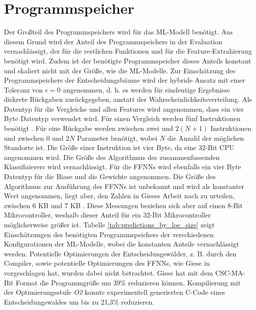\section{Programmspeicher}
Der Großteil des Programmspeichers wird für das ML-Modell benötigt.
Aus diesem Grund wird der Anteil des Programmspeichers in der Evaluation vernachlässigt,
der für die restlichen Funktionen und für die Feature-Extrahierung benötigt wird.
Zudem ist der benötigte Programmspeicher dieses Anteils konstant und skaliert nicht mit der Größe, wie die ML-Modelle.
\newpage
Zur Einschätzung des Programmspeichers der Entscheidungsbäume wird der hybride Ansatz mit einer Toleranz von $\epsilon=0$ angenommen,
d. h. es werden für eindeutige Ergebnisse diskrete Rückgaben zurückgegeben, anstatt der Wahrscheinlichkeitsverteilung.
Als Datentyp für die Vergleiche und allen Features wird angenommen, dass ein vier Byte Datentyp verwendet wird.
Für einen Vergleich werden fünf Instruktionen benötigt \cite{dymelThesis}.
Für eine Rückgabe werden zwischen zwei und $2(N+1)$ Instruktionen und zwischen 0 und $2N$ Parameter benötigt,
wobei $N$ die Anzahl der möglichen Standorte ist.
Die Größe einer Instruktion ist vier Byte, da eine 32-Bit CPU angenommen wird.
Die Größe des Algorithmus des zusammenfassenden Klassifizierers wird vernachlässigt.
\newline
\newline
Für die FFNNs wird ebenfalls ein vier Byte Datentyp für die Biase und die Gewichte angenommen.
Die Größe des Algorithmus zur Ausführung des FFNNs ist unbekannt und wird als konstanter Wert angenommen,
liegt aber, den Zahlen in Gieses Arbeit nach zu urteilen, zwischen 6 KB und 7 KB \cite{gieseThesis}.
Diese Messungen beziehen sich aber auf einen 8-Bit Mikrocontroller, weshalb dieser Anteil für ein 32-Bit Mikrocontroller möglicherweise größer ist.
\newline
\newline
Tabelle \ref{tab:predictions_by_loc_size} zeigt Einschätzungen des benötigten Programmspeichers der verschiedenen Konfigurationen der ML-Modelle,
wobei die konstanten Anteile vernachlässigt werden.
Potentielle Optimierungen der Entscheidungswälder, z. B. durch den Compiler,
sowie potentielle Optimierungen des FFNNs, wie Giese in \cite{gieseThesis} vorgeschlagen hat, wurden dabei nicht betrachtet.
Giese hat mit dem CSC-MA-Bit Format die Programmgröße um 39\% reduzieren können.
Kompilierung mit der Optimierungsstufe \textit{O2} konnte experimentell generierten C-Code
eines Entscheidungswaldes um bis zu 21,3\% reduzieren.
